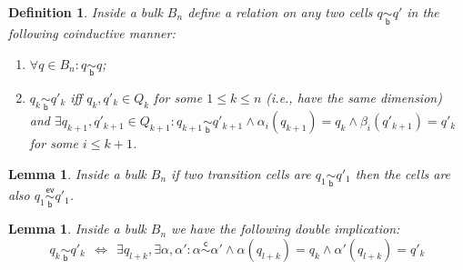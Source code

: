 \documentclass[submission,copyright,creativecommons]{eptcs}
\newtheorem{lemma}[theorem]{Lemma}
\newtheorem{definition}[theorem]{Definition}
\newcommand{\cp}[1]{}
\newcommand\eventEquivHDAsculpture{\ensuremath{\overset{\mathsf{ev}}{\underset{\mathsf{b}}{\sim}}}}
\newcommand\chainEquivHDAsculpture{\ensuremath{\overset{\mathsf{c}}{\sim}}}
\newcommand\cellEquivBulk{\ensuremath{\underset{\mathsf{b}}{\sim}}}
\begin{document}
\begin{definition}
Inside a bulk $B_{n}$ define a relation on any two cells $q\cellEquivBulk q'$ in the following coinductive manner:
\begin{enumerate}
\item $\forall q\in B_{n}:q\cellEquivBulk q$;

\item $q_{k}\cellEquivBulk q'_{k}$ iff $q_{k},q'_{k}\in Q_{k}$ for some $1\leq k\leq n$ (i.e., have the same dimension) and $\exists q_{k+1},q'_{k+1}\in Q_{k+1}:q_{k+1}\cellEquivBulk q'_{k+1}\wedge \alpha_{i}(q_{k+1})=q_{k}\wedge \beta_{i}(q'_{k+1})=q'_{k}$ for some $i\leq k+1$.
\end{enumerate}
\end{definition}

\begin{lemma}
Inside a bulk $B_{n}$ if two transition cells are $q_{1}\cellEquivBulk q'_{1}$ then the cells are also $q_{1}\eventEquivHDAsculpture q'_{1}$.
\end{lemma}

\cp{Give Proof!!}


\begin{lemma}\label{lemma_chains_equiv}
Inside a bulk $B_{n}$ we have the following double implication:
\[
q_{k}\cellEquivBulk q'_{k} \ \ \Leftrightarrow\ \ \exists q_{l+k},\exists\alpha,\alpha':\alpha\chainEquivHDAsculpture\alpha'\wedge\alpha(q_{l+k})=q_{k}\wedge\alpha'(q_{l+k})=q'_{k}
\]
\end{lemma}
\end{document}
